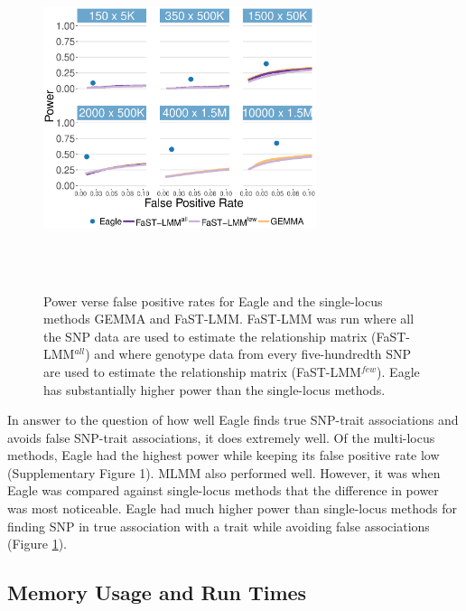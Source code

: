 \documentclass{bioinfo}
\begin{document}
\begin{figure}[!tpb]%
\centerline{\includegraphics[width=8cm, height=10cm]{power2main.eps}}
\vspace{-2cm}
\caption{Power verse false positive rates for Eagle and the single-locus methods GEMMA and FaST-LMM. 
FaST-LMM was run where all the SNP data are used 
to estimate the relationship matrix (FaST-LMM$^{all}$)   and where genotype data from every five-hundredth SNP are used to 
estimate the relationship matrix (FaST-LMM$^{few}$). Eagle has substantially higher power than the single-locus methods. }
\label{figpowersingle}
\end{figure}





In answer to the question of how well Eagle finds true SNP-trait associations and avoids false SNP-trait associations, it does extremely 
well.  Of the multi-locus methods, Eagle had the highest power
while keeping its false positive rate low (Supplementary Figure 1). MLMM also performed well. However, it was when Eagle was compared against single-locus methods 
that the difference in power was most noticeable.  Eagle had much higher power than single-locus methods for finding SNP in true 
association with a trait while avoiding false associations (Figure \ref{figpowersingle}). 





\subsection{Memory Usage and Run Times}
\end{document}
